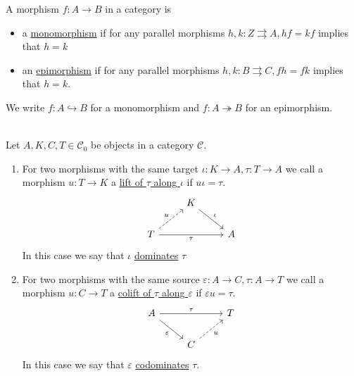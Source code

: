 \begin{definition}
A morphism $f : A \rightarrow B$ in a category is
\begin{itemize}
\item a \ul{monomorphism} if for any parallel morphisms $h, k : Z \rightrightarrows A, hf = kf$ implies that
$h = k$
\item an \ul{epimorphism} if for any parallel morphisms $h, k : B \rightrightarrows C, fh = fk$ implies that
$h = k$.
\end{itemize}
We write $f : A \hookrightarrow B$ for a monomorphism and $f : A \twoheadrightarrow B$ for an epimorphism.
\end{definition}

\begin{definition}\label{def:lift_colift_codominate}\phantom{}\\
Let $A, K, C, T \in \mathcal{C}_{0}$ be objects in a category $\mathcal{C}$.
\begin{enumerate}
\renewcommand{\labelenumi}{(\theenumi)}
\item For two morphisms with the same target $\iota : K \rightarrow A, \tau : T \rightarrow A$ we call a morphism $u : T \rightarrow K$ a
\ul{lift of $\tau$ along $\iota$} if $u \iota = \tau$.
\[
\begin{tikzcd}
                                              & K \arrow[rd, "\iota"] &   \\
T \arrow[rr, "\tau"'] \arrow[ru, "u", dashed] &                       & A
\end{tikzcd}
\]
In this case we say that $\iota$ \ul{dominates} $\tau$
\item For two morphisms with the same source $\varepsilon : A \rightarrow C, \tau : A \rightarrow T$ we call a morphism
$u : C \rightarrow T$ a \ul{colift of $\tau$ along $\varepsilon$} if $\varepsilon u = \tau$.
\[
\begin{tikzcd}
A \arrow[rr, "\tau"] \arrow[rd, "\varepsilon"'] &                            & T \\
                                                & C \arrow[ru, "u"', dashed] &  
\end{tikzcd}
\]
In this case we say that $\varepsilon$ \ul{codominates} $\tau$.
\end{enumerate}
\end{definition}

